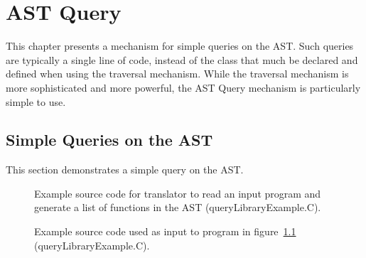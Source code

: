 \chapter{AST Query}

   This chapter presents a mechanism for simple queries on the AST.
Such queries are typically a single line of code, instead of the 
class that much be declared and defined when using the traversal mechanism.
While the traversal mechanism is more sophisticated and more powerful, the AST Query
mechanism is particularly simple to use.

\section{Simple Queries on the AST}

   This section demonstrates a simple query on the AST.

\begin{figure}[!h]
{\indent
{\mySmallFontSize


\begin{latexonly}
   
\end{latexonly}

\begin{htmlonly}
   
\end{htmlonly}

}
}
\caption{Example source code for translator to read an input program and 
         generate a list of functions in the AST (queryLibraryExample.C).}
\label{Tutorial:exampleQueryLibrary}
\end{figure}

\begin{figure}[!h]
{\indent
{\mySmallFontSize


\begin{latexonly}
   
\end{latexonly}

\begin{htmlonly}
   
\end{htmlonly}

}
}
\caption{Example source code used as input to program in
    figure~\ref{Tutorial:exampleQueryLibrary} (queryLibraryExample.C).}
\label{Tutorial:exampleInputCode_QueryLibrary}
\end{figure}

